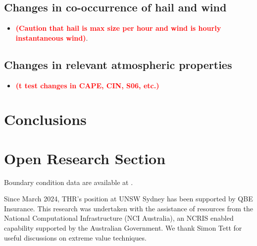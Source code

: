 \documentclass[]{agujournal2019}\usepackage[]{graphicx}\usepackage[]{xcolor}
\newcommand*{\todo}[1]{\textbf{\textcolor{red}{(#1)}}}
\begin{document}
\subsection{Changes in co-occurrence of hail and wind}

\begin{itemize}
\item \todo{Caution that hail is max size per hour and wind is hourly instantaneous wind}.
\end{itemize}

\subsection{Changes in relevant atmospheric properties}

\begin{itemize}
\item \todo{t test changes in CAPE, CIN, S06, etc.}
\end{itemize}

\section{Conclusions}

\section*{Open Research Section}

Boundary condition data are available at .


\acknowledgments

Since March 2024, THR's position at UNSW Sydney has been supported by QBE Insurance. This research was undertaken with the assistance of resources from the National Computational Infrastructure (NCI Australia), an NCRIS enabled capability supported by the Australian Government. We thank Simon Tett for useful discussions on extreme value techniques.


\end{document}
